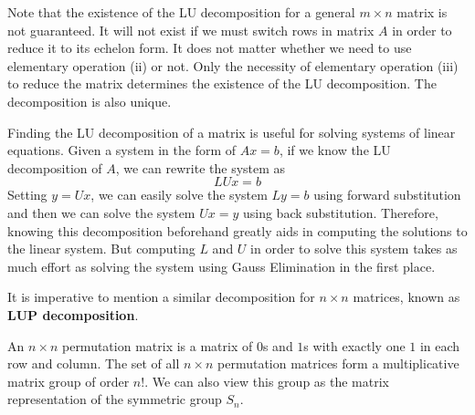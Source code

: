   Note that the existence of the LU decomposition for a general $m \times n$ matrix is not guaranteed. It will not exist if we must switch rows in matrix $A$ in order to reduce it to its echelon form. It does not matter whether we need to use elementary operation (ii) or not. Only the necessity of elementary operation (iii) to reduce the matrix determines the existence of the LU decomposition. The decomposition is also unique. 

  Finding the LU decomposition of a matrix is useful for solving systems of linear equations. Given a system in the form of $A x = b$, if we know the LU decomposition of $A$, we can rewrite the system as 
  \begin{equation}
    L U x = b
  \end{equation}
  Setting $y = U x$, we can easily solve the system $L y = b$ using forward substitution and then we can solve the system $U x = y$ using back substitution. Therefore, knowing this decomposition beforehand greatly aids in computing the solutions to the linear system. But computing $L$ and $U$ in order to solve this system takes as much effort as solving the system using Gauss Elimination in the first place. 

  It is imperative to mention a similar decomposition for $n \times n$ matrices, known as \textbf{LUP decomposition}. 

  \begin{definition}
    An $n \times n$ permutation matrix is a matrix of $0$s and $1$s with exactly one $1$ in each row and column. The set of all $n \times n$ permutation matrices form a multiplicative matrix group of order $n!$. We can also view this group as the matrix representation of the symmetric group $S_n$. 
  \end{definition}

